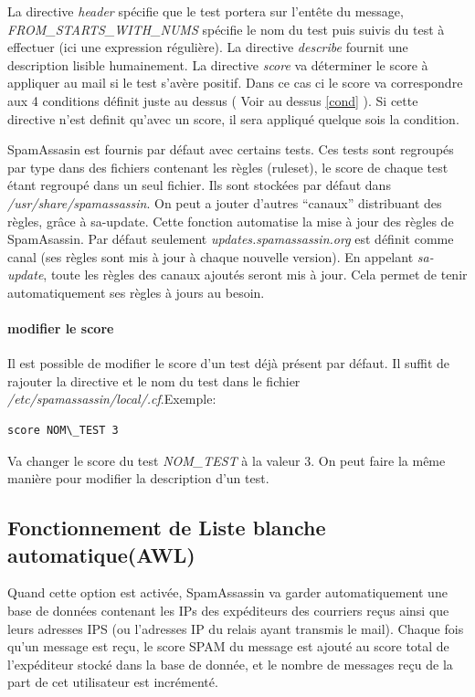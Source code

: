 \documentclass[a4paper,11pt]{article}
\begin{document}
La directive \emph{header} spécifie que le test portera sur l'entête du message, 
\emph{FROM\_STARTS\_WITH\_NUMS} spécifie le nom du test puis suivis du test à effectuer (ici une expression régulière).
La directive \emph{describe} fournit une description lisible humainement.
La directive \emph{score} va déterminer le score à appliquer au mail si le test s'avère positif. Dans ce cas ci
le score va correspondre aux 4 conditions définit juste au dessus ( Voir au dessus \ref{cond} ). Si cette directive n'est definit qu'avec
un score, il sera appliqué quelque sois la condition.

SpamAssasin est fournis par défaut avec certains tests. Ces tests sont regroupés par type dans des fichiers contenant les règles (ruleset), le score de chaque test 
étant regroupé dans un seul fichier. Ils sont stockées par défaut dans \emph{/usr/share/spamassassin}. On peut
a jouter d'autres ``canaux'' distribuant des règles, grâce à sa-update. Cette fonction automatise la mise
à jour des règles de SpamAsassin. Par défaut seulement \emph{updates.spamassassin.org} est définit comme canal
(ses règles sont mis à jour à chaque nouvelle version). En appelant \emph{sa-update}, toute les règles 
des canaux ajoutés seront mis à jour. Cela permet de tenir automatiquement ses règles à jours au besoin.

\paragraph{modifier le score}
Il est possible de modifier le score d'un test déjà présent par défaut.
Il suffit de rajouter la directive et le nom du test dans le fichier \emph{ /etc/spamassassin/local/.cf}.Exemple:\linebreak
\begin{lstlisting}
score NOM\_TEST 3
\end{lstlisting}
Va changer le score du test \emph{NOM\_TEST} à la valeur 3. On peut faire la même manière pour modifier 
la description d'un test.
\subsection{Fonctionnement de Liste blanche automatique(AWL)}

Quand cette option est activée, SpamAssassin va garder automatiquement une base de données contenant les IPs des expéditeurs des courriers reçus ainsi 
que leurs adresses IPS (ou l'adresses IP du relais ayant transmis le mail). Chaque fois qu'un message est reçu, le score SPAM du message 
est ajouté au score total de l'expéditeur stocké dans la base de donnée, et le nombre de messages reçu de la part de
cet utilisateur est incrémenté. 
\end{document}

